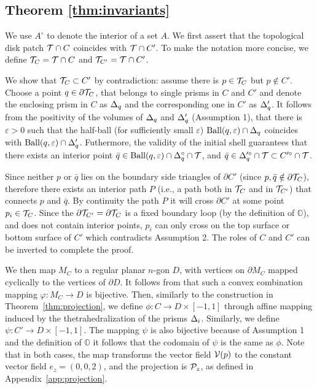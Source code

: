 \subsection{Theorem \ref{thm:invariants}}\label{app:invariant-checks}
We use $A^\circ$ to denote the interior of a set $A$. 
We first assert that the topological disk patch $\T \cap C$ coincides with $\T \cap C'$.
To make the notation more concise, we define $\T_C = \T \cap C$ and $\T_{C'} = \T \cap C'$.

We show that $\T_C \subset C'$ by contradiction: assume there is $p\in \T_C$ but $p \not\in C'$.
Choose a point $q \in \partial \T_C$,  that belongs to single prisms in $C$ and $C'$ and denote the enclosing prism in $C$ as $\Prism_q$ and the corresponding one in $C'$ as $\Prism_{q}'$.
It follows from the positivity of the volumes of $\Prism_q$ and $\Prism_q'$ (Assumption 1), that there is  $\varepsilon>0$ such that the half-ball (for sufficiently small $\varepsilon$)  $\text{Ball}(q, \varepsilon) \cap \Prism_q$  coincides with $ \text{Ball}(q, \varepsilon) \cap \Prism_q'$.
Futhermore, the validity of the initial shell guarantees that there exists an interior point $\bar{q} \in \text{Ball}(q, \varepsilon) \cap \Prism_q^\circ \cap \T$, and $\bar{q}\in \Prism_q'^\circ \cap \T \subset C'^\circ\cap \T$.

 Since neither $p$ or $\bar{q}$ lies on the boundary side triangles of $\partial C'$ (since $p,\bar{q}\notin\partial \T_C$), therefore there exists an interior path $P$ (i.e., a path both in $\T_C$ and in $\T_{C'}$) that connects $p$ and $\bar{q}$. By continuity the path $P$ it will cross $\partial C'$ at some point $p_i\in \T_C$. 
Since the $\partial \T_{C'} = \partial \T_C$ is a fixed boundary loop (by the definition of $\mathbb{O}$), and does not contain interior points, $p_i$ can only cross on the top surface or bottom surface of $C'$ which contradicts Assumption 2. The roles of $C$ and $C'$ can be inverted to complete the proof. 

We then  map $M_C$ to a
regular planar $n$-gon $D$, with vertices on $\partial M_C$ mapped cyclically to the vertices of $\partial D$.
It follows from \cite[Corollary 6.2]{floater2003one} that such a convex combination mapping $\varphi\colon M_C \to D$ is bijective. Then, similarly to the construction in Theorem~\ref{thm:projection},
we 
define $\phi\colon C \to D\times[-1,1]$ through affine mapping induced by the thetrahedralization of the prisms $\Prism_i$.
%
Similarly, we define $\psi \colon C' \to D\times[-1,1]$. The mapping $\psi$ is also bijective because of Assumption 1 and the definition of $\mathbb{O}$ it follows that the codomain of $\psi$ is the same as $\phi$.
%
Note that in both cases, the map transforms the vector field $\V(p)$ to the constant vector field $e_z = (0,0,2)$, and the projection is $\P_z$, as defined in Appendix~\ref{app:projection}. 

